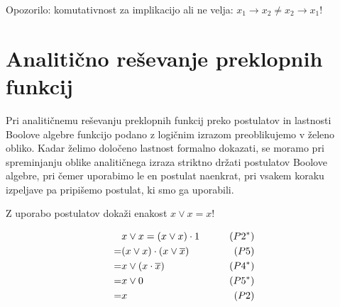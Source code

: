 Opozorilo: komutativnost za implikacijo ali ne velja: $x_1 \rightarrow x_2 \neq x_2 \rightarrow x_1$!


\section{Analitično reševanje preklopnih funkcij}

Pri analitičnemu reševanju preklopnih funkcij preko postulatov in lastnosti Boolove algebre funkcijo podano z logičnim izrazom preoblikujemo v želeno obliko. Kadar želimo določeno lastnost formalno dokazati, se moramo pri spreminjanju oblike analitičnega izraza striktno držati postulatov Boolove algebre, pri čemer uporabimo le en postulat naenkrat, pri vsakem koraku izpeljave pa pripišemo postulat, ki smo ga uporabili. 


\begin{zgled}
Z uporabo postulatov dokaži enakost $x \vee x = x$!
\end{zgled}

\begin{resitev}
\begin{align*}
& x \vee x = (x \vee x) \cdot 1  & \qquad (P2^*) \\
 = & (x \vee x) \cdot (x \vee \overline x) & \qquad (P5) \\
 = & x \vee (x \cdot \overline x)& \qquad (P4^*) \\
 = & x \vee 0 & \qquad (P5^*) \\
 = & x\qquad & (P2)
\end{align*}
\end{resitev}

